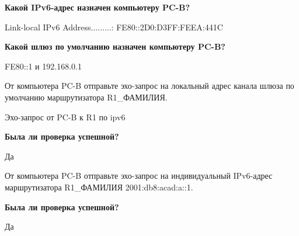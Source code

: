 \textbf{Какой IPv6-адрес назначен компьютеру PC-B?}

Link-local IPv6 Address.........: FE80::2D0:D3FF:FEEA:441C

\textbf{Какой шлюз по умолчанию назначен компьютеру PC-B?}

FE80::1 и 192.168.0.1

От компьютера PC-B отправьте эхо-запрос на локальный адрес
канала шлюза по умолчанию маршрутизатора R1\_ФАМИЛИЯ.

\begin{image}
	\caption{Эхо-запрос от PC-B к R1 по ipv6}
\end{image}

\textbf{Была ли проверка успешной?}

Да

От компьютера PC-B отправьте эхо-запрос на индивидуальный IPv6-адрес
маршрутизатора R1\_ФАМИЛИЯ 2001:db8:acad:a::1.

\textbf{Была ли проверка успешной?}

Да

